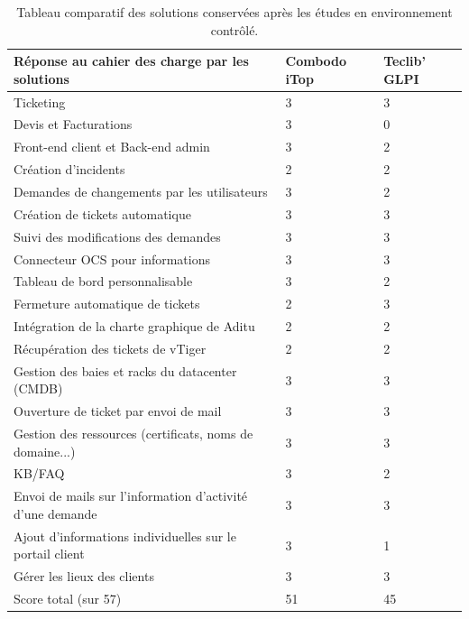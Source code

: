 \begin{sloppypar}
\begin{table}[H]
    \centering
    \captionsetup{justification=centering}
    \begin{tabular}{|l|l|l|}
    \hline
    Réponse au cahier des charge par les solutions            & Combodo iTop & Teclib' GLPI \\ \hline
    Ticketing                                                 & 3            & 3            \\
    Devis et Facturations                                     & 3            & 0            \\
    Front-end client et Back-end admin                        & 3            & 2            \\
    Création d'incidents                                      & 2            & 2            \\
    Demandes de changements par les utilisateurs              & 3            & 2            \\
    Création de tickets automatique                           & 3            & 3            \\
    Suivi des modifications des demandes                      & 3            & 3            \\
    Connecteur OCS pour informations                          & 3            & 3            \\
    Tableau de bord personnalisable                           & 3            & 2            \\
    Fermeture automatique de tickets                          & 2            & 3            \\
    Intégration de la charte graphique de Aditu               & 2            & 2            \\
    Récupération des tickets de vTiger                        & 2            & 2            \\
    Gestion des baies et racks du datacenter (CMDB)           & 3            & 3            \\
    Ouverture de ticket par envoi de mail                     & 3            & 3            \\
    Gestion des ressources (certificats, noms de domaine...)  & 3            & 3            \\
    KB/FAQ                                                    & 3            & 2            \\
    Envoi de mails sur l'information d'activité d'une demande & 3            & 3            \\
    Ajout d'informations individuelles sur le portail client  & 3            & 1            \\
    Gérer les lieux des clients                               & 3            & 3            \\ \hline
    Score total (sur 57)                                      & 51           & 45           \\
    \hline
    \end{tabular}
    \caption{Tableau comparatif des solutions conservées après les études en environnement contrôlé.}
    \label{tab:comparatif} 
\end{table}


\end{sloppypar}
